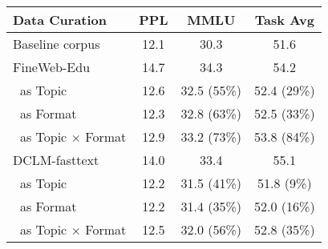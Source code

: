     \begin{tabular}{lccc}
        \toprule
        \textbf{Data Curation} & {PPL} & {MMLU} & {Task Avg} \\
        \midrule
        Baseline corpus & 12.1 & 30.3 & 51.6 \\
        \midrule
        FineWeb-Edu & 14.7 & 34.3 & 54.2 \\
        \cmidrule(lr){2-4}
        $\;\;${as Topic} & 12.6 & 32.5 {\scriptsize (55\%)} & 52.4 {\scriptsize (29\%)} \\
        $\;\;${as Format} & 12.3 & 32.8 {\scriptsize (63\%)} & 52.5 {\scriptsize (33\%)} \\
        $\;\;${as Topic $\times$ Format} & 12.9 & 33.2 {\scriptsize (73\%)}  & 53.8 {\scriptsize (84\%)} \\
        \midrule
        DCLM-fasttext & 14.0 & 33.4 & 55.1 \\
        \cmidrule(lr){2-4}
        $\;\;${as Topic} & 12.2 & 31.5 {\scriptsize (41\%)} & 51.8 {\scriptsize (9\%)\phantom{0}} \\
        $\;\;${as Format} & 12.2 & 31.4 {\scriptsize (35\%)} & 52.0 {\scriptsize (16\%)} \\
        $\;\;${as Topic $\times$ Format} & 12.5 & 32.0 {\scriptsize (56\%)} & 52.8 {\scriptsize (35\%)} \\
        \bottomrule
    \end{tabular}
    \icmlskip{-0.1in}
    \label{tab:results_quality}
\fi
